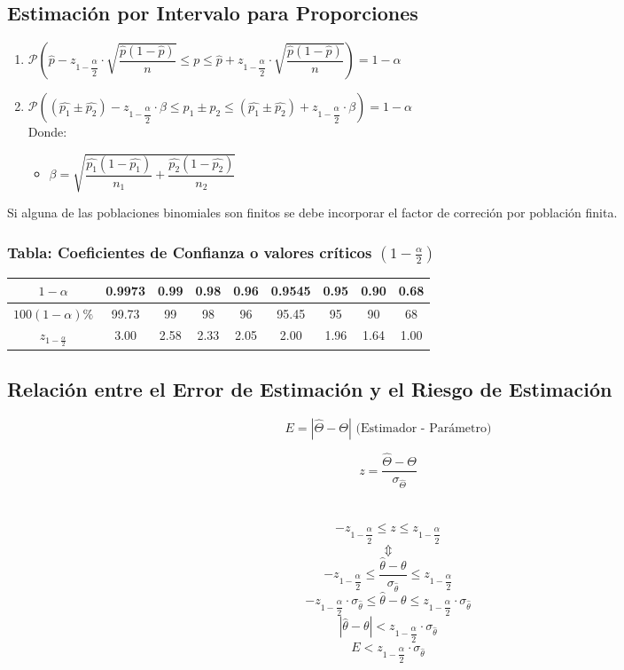 \subsection{Estimación por Intervalo para Proporciones}
\begin{enumerate}[label=\textbf{(\Roman*)}]
\item $\mathcal{P}\left(\hat{p}-z_{1-\dfrac{\alpha}{2}}\cdot\sqrt{\dfrac{\hat{p}(1-\hat{p})}{n}}\leq p \leq \hat{p}+z_{1-\dfrac{\alpha}{2}}\cdot\sqrt{\dfrac{\hat{p}(1-\hat{p})}{n}}  \right)=1-\alpha$
\item $\mathcal{P}\left((\widehat{p_1}\pm\widehat{p_2})-z_{1-\dfrac{\alpha}{2}}\cdot\beta\leq p_1\pm p_2\leq (\widehat{p_1}\pm\widehat{p_2})+z_{1-\dfrac{\alpha}{2}}\cdot\beta\right)=1-\alpha$\\
 Donde:
  \begin{itemize}
  \item $\beta = \sqrt{\dfrac{\hat{p_1}(1-\hat{p_1})}{n_1}+\dfrac{\hat{p_2}(1-\hat{p_2})}{n_2}} $
   \end{itemize}
\end{enumerate}
Si alguna de las poblaciones binomiales son finitos se debe incorporar el factor de correción por población finita.
\subsubsection{Tabla: Coeficientes de Confianza o valores críticos $(1-\frac{\alpha}{2})$}
\begin{center}
 \begin{tabular}{|c|c|c|c|c|c|c|c|c|}
\hline 
$1-\alpha$ & 0.9973 & 0.99 & 0.98 & 0.96 & 0.9545 & 0.95 & 0.90 & 0.68 \\ 
\hline 
$100(1-\alpha)\%$ & 99.73 & 99 & 98 & 96 & 95.45 & 95 & 90 & 68 \\ 
\hline 
$z_{1-\frac{\alpha}{2}}$ & 3.00 & 2.58 & 2.33 & 2.05 & 2.00 & 1.96 & 1.64 & 1.00 \\ 
\hline
\end{tabular}
 \end{center} 

\subsection{Relación entre el Error de Estimación y el Riesgo de Estimación}
$$ E=|\widehat{\Theta}-\Theta | \text{ (Estimador - Parámetro)} $$

$$z = \dfrac{\widehat{\Theta}-\Theta}{\sigma_{\widehat{\Theta}}}$$ \\{ }\\
$$ -z_{1-\dfrac{\alpha}{2}} \leq z \leq z_{1-\dfrac{\alpha}{2}} $$
  $$\Updownarrow$$
  $$ -z_{1-\dfrac{\alpha}{2}} \leq \dfrac{\widehat{\theta}-\theta}{\sigma_{\widehat{\theta}}} \leq z_{1-\dfrac{\alpha}{2}} $$
  $$-z_{1-\dfrac{\alpha}{2}}\cdot\sigma_{\widehat{\theta}} \leq {\widehat{\theta}-\theta} \leq z_{1-\dfrac{\alpha}{2}}\cdot\sigma_{\widehat{\theta}}$$
  $$|{\widehat{\theta}-\theta} | < z_{1-\dfrac{\alpha}{2}}\cdot\sigma_{\widehat{\theta}} $$
  $$ E  < z_{1-\dfrac{\alpha}{2}}\cdot\sigma_{\widehat{\theta}}$$
